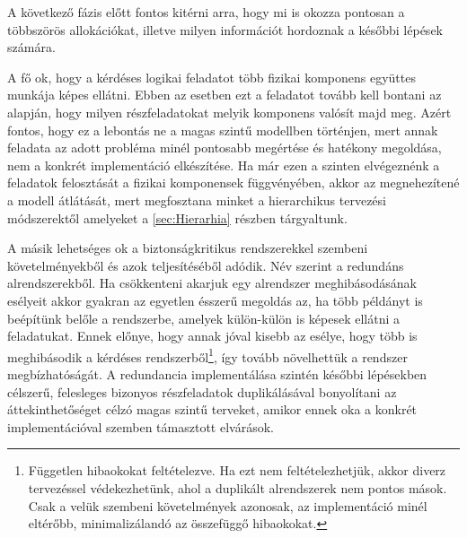         A következő fázis előtt fontos kitérni arra, hogy mi is okozza pontosan a többszörös allokációkat, illetve milyen információt hordoznak a későbbi lépések számára.
        
        A fő ok, hogy a kérdéses logikai feladatot több fizikai komponens együttes munkája képes ellátni. Ebben az esetben ezt a feladatot tovább kell bontani az alapján, hogy milyen részfeladatokat melyik komponens valósít majd meg.
        Azért fontos, hogy ez a lebontás ne a magas szintű modellben történjen, mert annak feladata az adott probléma minél pontosabb megértése és hatékony megoldása, nem a konkrét implementáció elkészítése.
        Ha már ezen a szinten elvégeznénk a feladatok felosztását a fizikai komponensek függvényében, akkor az megnehezítené a modell átlátását, mert megfosztana minket a hierarchikus tervezési módszerektől amelyeket a \ref{sec:Hierarhia} részben tárgyaltunk.
        
        A másik lehetséges ok a biztonságkritikus rendszerekkel szembeni követelményekből és azok teljesítéséből adódik. Név szerint a redundáns alrendszerekből. Ha csökkenteni akarjuk egy alrendszer meghibásodásának esélyeit akkor gyakran az egyetlen ésszerű megoldás az, ha több példányt is beépítünk belőle a rendszerbe, amelyek külön-külön is képesek ellátni a feladatukat.
        Ennek előnye, hogy annak jóval kisebb az esélye, hogy több is meghibásodik a kérdéses rendszerből\footnote{Független hibaokokat feltételezve. Ha ezt nem feltételezhetjük, akkor diverz tervezéssel védekezhetünk, ahol a duplikált alrendszerek nem pontos mások. Csak a velük szembeni követelmények azonosak, az implementáció minél eltérőbb, minimalizálandó az összefüggő hibaokokat.}, így tovább növelhettük a rendszer megbízhatóságát.
        A redundancia implementálása szintén későbbi lépésekben célszerű, felesleges bizonyos részfeladatok duplikálásával bonyolítani az áttekinthetőséget célzó magas szintű terveket, amikor ennek oka a konkrét implementációval szemben támasztott elvárások.

